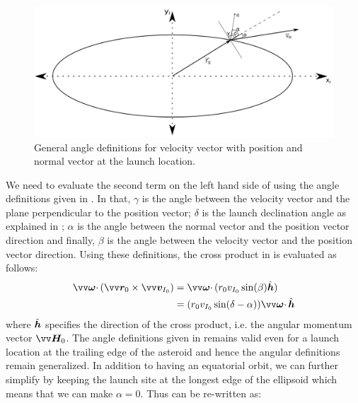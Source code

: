 \begin{figure}[htb]
\centering
\captionsetup{justification=centering}
\includegraphics[width=\textwidth, height=0.3\textheight, keepaspectratio=true]{non_conservative_escape_velocity_angles.pdf}
\caption{General angle definitions for velocity vector with position and normal vector at the launch location.}
\label{fig:velocity_vector_angles}
\end{figure}
\FloatBarrier
We need to evaluate the second term on the left hand side of  using the angle definitions given in . In that, $\gamma$ is the angle between the velocity vector and the plane perpendicular to the position vector; $\delta$ is the launch declination angle as explained in ; $\alpha$ is the angle between the normal vector and the position vector direction and finally, $\beta$ is the angle between the velocity vector and the position vector direction. Using these definitions, the cross product in  is evaluated as follows:
\begin{align}
    \bv{\omega} \cdotp (\bv{r}_0 \times \bv{v}_{I_0}) &= \bv{\omega} \cdotp (r_0 v_{I_0} \sin(\beta) \buv{h}) \\
    &= (r_0 v_{I_0} \sin(\delta - \alpha)) \bv{\omega} \cdotp \buv{h}
    \label{eqn:cross_product_eval}
\end{align}
where $\hat{\bm{h}}$ specifies the direction of the cross product, i.e. the angular momentum vector $\bv{H}_0$. The angle definitions given in  remains valid even for a launch location at the trailing edge of the asteroid and hence the angular definitions remain generalized. In addition to having an equatorial orbit, we can further simplify  by keeping the launch site at the longest edge of the ellipsoid which means that we can make $\alpha=0$. Thus  can be re-written as:
